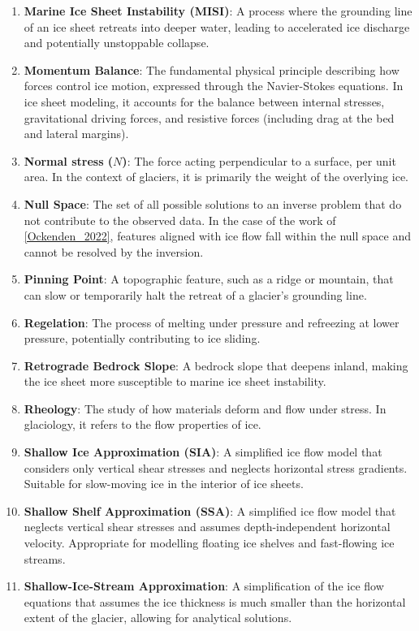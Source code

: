 \begin{enumerate}
\item \textbf{Marine Ice Sheet Instability (MISI)}: A process where the grounding line of an ice sheet retreats into deeper water, leading to accelerated ice discharge and potentially unstoppable collapse.
\item \textbf{Momentum Balance}: The fundamental physical principle describing how forces control ice motion, expressed through the Navier-Stokes equations. In ice sheet modeling, it accounts for the balance between internal stresses, gravitational driving forces, and resistive forces (including drag at the bed and lateral margins).
\item \textbf{Normal stress ($N$)}: The force acting perpendicular to a surface, per unit area. In the context of glaciers, it is primarily the weight of the overlying ice.
\item \textbf{Null Space}: The set of all possible solutions to an inverse problem that do not contribute to the observed data. In the case of the work of \ref{Ockenden_2022}, features aligned with ice flow fall within the null space and cannot be resolved by the inversion.
\item \textbf{Pinning Point}: A topographic feature, such as a ridge or mountain, that can slow or temporarily halt the retreat of a glacier's grounding line.
\item \textbf{Regelation}: The process of melting under pressure and refreezing at lower pressure, potentially contributing to ice sliding.
\item \textbf{Retrograde Bedrock Slope}: A bedrock slope that deepens inland, making the ice sheet more susceptible to marine ice sheet instability.
\item \textbf{Rheology}: The study of how materials deform and flow under stress. In glaciology, it refers to the flow properties of ice.
\item \textbf{Shallow Ice Approximation (SIA)}: A simplified ice flow model that considers only vertical shear stresses and neglects horizontal stress gradients. Suitable for slow-moving ice in the interior of ice sheets.
\item \textbf{Shallow Shelf Approximation (SSA)}: A simplified ice flow model that neglects vertical shear stresses and assumes depth-independent horizontal velocity. Appropriate for modelling floating ice shelves and fast-flowing ice streams.
\item \textbf{Shallow-Ice-Stream Approximation}: A simplification of the ice flow equations that assumes the ice thickness is much smaller than the horizontal extent of the glacier, allowing for analytical solutions.

\end{enumerate}
